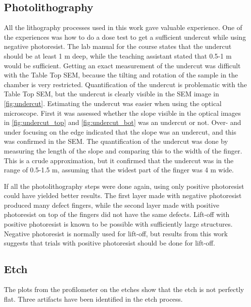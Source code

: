 
\subsection{Photolithography}
\label{sec:discussion:photolithography}

All the lithography processes used in this work gave valuable experience.
One of the experiences was how to do a dose test to get a sufficient undercut while using negative photoresist. 
The lab manual for the course \cite{labmanual} states that the undercut should be at least 1 \textmu m deep, while the teaching assistant stated that 0.5-1 \textmu m would be sufficient.
Getting an exact measurement of the undercut was difficult with the Table Top SEM, because the tilting and rotation of the sample in the chamber is very restricted. 
Quantification of the undercut is problematic with the Table Top SEM, but the undercut is clearly visible in the SEM image in \autoref{fig:undercut}.
Estimating the undercut was easier when using the optical microscope. 
First it was assessed whether the slope visible in the optical images in \autoref{fig:undercut_top} and \autoref{fig:undercut_bot} was an undercut or not.
Over- and under focusing on the edge indicated that the slope was an undercut, and this was confirmed in the SEM. 
The quantification of the undercut was done by measuring the length of the slope and comparing this to the width of the finger. 
This is a crude approximation, but it confirmed that the undercut was in the range of 0.5-1.5 \textmu m, assuming that the widest part of the finger was 4 \textmu m wide.


If all the photolithography steps were done again, using only positive photoresist could have yielded better results.
The first layer made with negative photoresist produced many defect fingers, while the second layer made with positive photoresist on top of the fingers did not have the same defects.
Lift-off with positive photoresist is known to be possible with sufficiently large structures. 
Negative photoresist is normally used for lift-off, but results from this work suggests that trials with positive photoresist should be done for lift-off. 


\subsection{Etch}
\label{sec:discussion:etch}

The plots from the profilometer on the etches show that the etch is not perfectly flat.
Three artifacts have been identified in the etch process.

